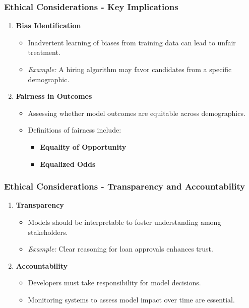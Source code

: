 \documentclass[aspectratio=169]{beamer}
\begin{document}
\begin{frame}[fragile]
    \frametitle{Ethical Considerations - Key Implications}
    \begin{enumerate}
        \item \textbf{Bias Identification}
            \begin{itemize}
                \item Inadvertent learning of biases from training data can lead to unfair treatment.
                \item \textit{Example:} A hiring algorithm may favor candidates from a specific demographic.
            \end{itemize}
        \item \textbf{Fairness in Outcomes}
            \begin{itemize}
                \item Assessing whether model outcomes are equitable across demographics.
                \item Definitions of fairness include:
                    \begin{itemize}
                        \item \textbf{Equality of Opportunity}
                        \item \textbf{Equalized Odds}
                    \end{itemize}
            \end{itemize}
    \end{enumerate}
\end{frame}

\begin{frame}[fragile]
    \frametitle{Ethical Considerations - Transparency and Accountability}
    \begin{enumerate}[resume]
        \item \textbf{Transparency}
            \begin{itemize}
                \item Models should be interpretable to foster understanding among stakeholders.
                \item \textit{Example:} Clear reasoning for loan approvals enhances trust.
            \end{itemize}
        \item \textbf{Accountability}
            \begin{itemize}
                \item Developers must take responsibility for model decisions.
                \item Monitoring systems to assess model impact over time are essential.
            \end{itemize}
    \end{enumerate}
\end{frame}
\end{document}
